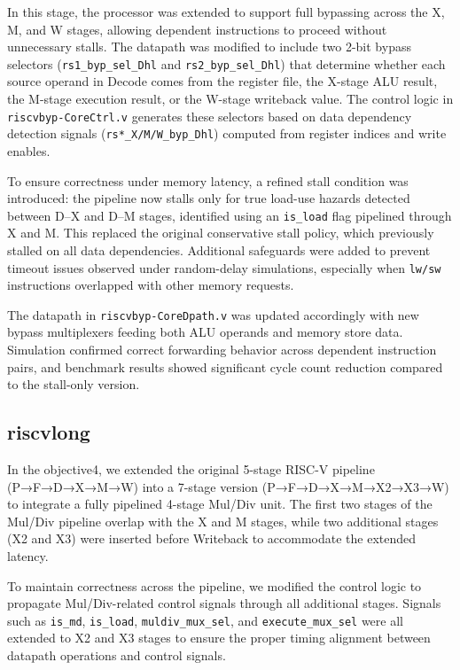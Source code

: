 \documentclass[11pt,a4paper]{article}
\begin{document}
In this stage, the processor was extended to support full bypassing across the X, M, and W stages,
allowing dependent instructions to proceed without unnecessary stalls.
The datapath was modified to include two 2-bit bypass selectors (\texttt{rs1\_byp\_sel\_Dhl} and \texttt{rs2\_byp\_sel\_Dhl})
that determine whether each source operand in Decode comes from the register file, the X-stage ALU result,
the M-stage execution result, or the W-stage writeback value.
The control logic in \texttt{riscvbyp-CoreCtrl.v} generates these selectors based on data dependency detection signals
(\texttt{rs*\_X/M/W\_byp\_Dhl}) computed from register indices and write enables.

To ensure correctness under memory latency, a refined stall condition was introduced:
the pipeline now stalls only for true load-use hazards detected between D–X and D–M stages,
identified using an \texttt{is\_load} flag pipelined through X and M.
This replaced the original conservative stall policy, which previously stalled on all data dependencies.
Additional safeguards were added to prevent timeout issues observed under random-delay simulations,
especially when \texttt{lw/sw} instructions overlapped with other memory requests.

The datapath in \texttt{riscvbyp-CoreDpath.v} was updated accordingly with new bypass multiplexers
feeding both ALU operands and memory store data.  
Simulation confirmed correct forwarding behavior across dependent instruction pairs,
and benchmark results showed significant cycle count reduction compared to the stall-only version.

\subsection{riscvlong }
In the objective4, we extended the original 5-stage RISC-V pipeline (P→F→D→X→M→W) into a 7-stage version (P→F→D→X→M→X2→X3→W) to integrate a fully pipelined 4-stage Mul/Div unit. The first two stages of the Mul/Div pipeline overlap with the X and M stages, while two additional stages (X2 and X3) were inserted before Writeback to accommodate the extended latency. 

To maintain correctness across the pipeline, we modified the control logic to propagate Mul/Div-related control signals through all additional stages. Signals such as \texttt{is\_md}, \texttt{is\_load}, \texttt{muldiv\_mux\_sel}, and \texttt{execute\_mux\_sel} were all extended to X2 and X3 stages to ensure the proper timing alignment between datapath operations and control signals.
\end{document}
